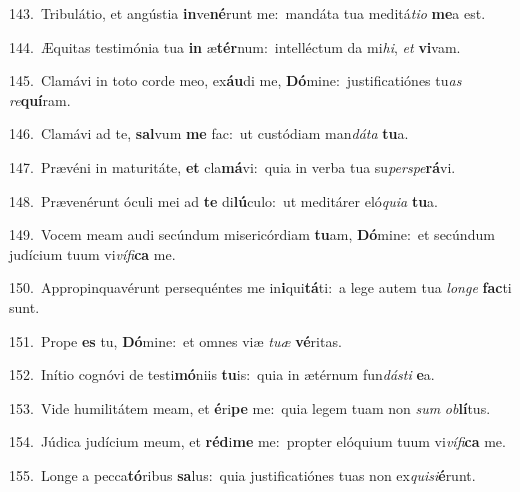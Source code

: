 {\numbfont\textcolor{\numbcolor}{143.}}~Tribulátio, et angústia \textbf{in}\-ve\-\textbf{né}\-runt me:~\star mandáta tua meditá\-\textit{ti}\-\textit{o} \textbf{me}\-a est.\par
{\numbfont\textcolor{\numbcolor}{144.}}~Æquitas testimónia tua \textbf{in} æ\-\textbf{tér}\-num:~\star intelléctum da mi\-\textit{hi}\-, \textit{et} \textbf{vi}\-vam.\par
{\numbfont\textcolor{\numbcolor}{145.}}~Clamávi in toto corde meo, ex\-\textbf{áu}\-di me, \textbf{Dó}\-mine:~\star justificatiónes tu\textit{as} \textit{re}\-\textbf{quí}ram.\par
{\numbfont\textcolor{\numbcolor}{146.}}~Clamávi ad te, \textbf{sal}\-vum \textbf{me} fac:~\star ut custódiam man\-\textit{dá}\-\textit{ta} \textbf{tu}\-a.\par
{\numbfont\textcolor{\numbcolor}{147.}}~Prævéni in maturitáte, \textbf{et} cla\-\textbf{má}\-vi:~\star quia in verba tua su\-\textit{per}\-\textit{spe}\textbf{rá}vi.\par
{\numbfont\textcolor{\numbcolor}{148.}}~Prævenérunt óculi mei ad \textbf{te} di\-\textbf{lú}\-culo:~\star ut meditárer eló\-\textit{qui}\-\textit{a} \textbf{tu}\-a.\par
{\numbfont\textcolor{\numbcolor}{149.}}~Vocem meam audi secúndum misericórdiam \textbf{tu}\-am, \textbf{Dó}\-mine:~\star et secúndum judícium tuum vi\-\textit{ví}\-\textit{fi}\textbf{ca} me.\par
{\numbfont\textcolor{\numbcolor}{150.}}~Appropinquavérunt persequéntes me in\-\textbf{i}\-qui\-\textbf{tá}\-ti:~\star a lege autem tua \textit{lon}\-\textit{ge} \textbf{fac}\-ti sunt.\par
{\numbfont\textcolor{\numbcolor}{151.}}~Prope \textbf{es} tu, \textbf{Dó}\-mine:~\star et omnes viæ \textit{tu}\-\textit{æ} \textbf{vé}\-ritas.\par
{\numbfont\textcolor{\numbcolor}{152.}}~Inítio cognóvi de testi\-\textbf{mó}\-niis \textbf{tu}\-is:~\star quia in ætérnum fun\-\textit{dás}\-\textit{ti} \textbf{e}\-a.\par
{\numbfont\textcolor{\numbcolor}{153.}}~Vide humilitátem meam, et \textbf{é}\-ri\textbf{pe} me:~\star quia legem tuam non \textit{sum} \textit{ob}\-\textbf{lí}tus.\par
{\numbfont\textcolor{\numbcolor}{154.}}~Júdica judícium meum, et \textbf{réd}\-i\textbf{me} me:~\star propter elóquium tuum vi\-\textit{ví}\-\textit{fi}\textbf{ca} me.\par
{\numbfont\textcolor{\numbcolor}{155.}}~Longe a pecca\-\textbf{tó}\-ribus \textbf{sa}\-lus:~\star quia justificatiónes tuas non ex\-\textit{qui}\-\textit{si}\textbf{é}runt.\par
